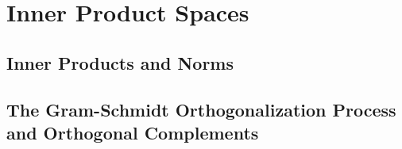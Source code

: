 \setcounter{chapter}{5}
\chapter{Inner Product Spaces}
\thispagestyle{empty}
\newpage

\section{Inner Products and Norms}



\vspace{12pt}

\setcounter{Exercise}{3}


\vspace{12pt}

\setcounter{Exercise}{7}


\vspace{12pt}



\vspace{12pt}

\setcounter{Exercise}{10}


\vspace{12pt}




\section{The Gram-Schmidt Orthogonalization Process and Orthogonal Complements}



\vspace{12pt}



\vspace{12pt}

\setcounter{Exercise}{5}


\vspace{12pt}

\setcounter{Exercise}{12}


\vspace{12pt}

\setcounter{Exercise}{18}



